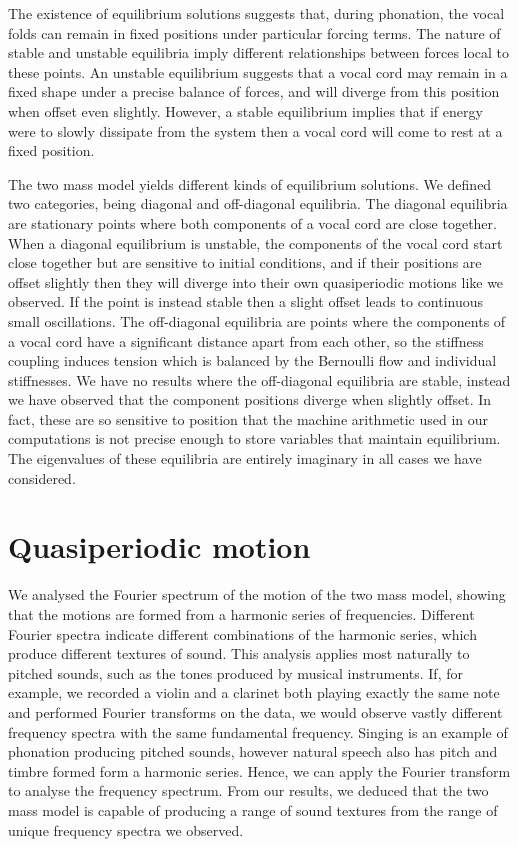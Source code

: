 \documentclass{report}
\begin{document}
The existence of equilibrium solutions suggests that, during phonation, the vocal folds can remain in fixed positions under particular forcing terms.
The nature of stable and unstable equilibria imply different relationships between forces local to these points.
An unstable equilibrium suggests that a vocal cord may remain in a fixed shape under a precise balance of forces,
and will diverge from this position when offset even slightly.
However, a stable equilibrium implies that if energy were to slowly dissipate from the system then a vocal cord will come to rest at a fixed position.

The two mass model yields different kinds of equilibrium solutions.
We defined two categories, being diagonal and off-diagonal equilibria.
The diagonal equilibria are stationary points where both components of a vocal cord are close together.
When a diagonal equilibrium is unstable,
the components of the vocal cord start close together but are sensitive to initial conditions,
and if their positions are offset slightly then they will diverge into their own quasiperiodic motions like we observed.
If the point is instead stable then a slight offset leads to continuous small oscillations.
The off-diagonal equilibria are points where the components of a vocal cord have a significant distance apart from each other, so the stiffness coupling induces tension which is balanced by the Bernoulli flow and individual stiffnesses.
We have no results where the off-diagonal equilibria are stable,
instead we have observed that the component positions diverge when slightly offset.
In fact, these are so sensitive to position that the machine arithmetic used in our computations is not precise enough to store variables that maintain equilibrium.
The eigenvalues of these equilibria are entirely imaginary in all cases we have considered.

\section{Quasiperiodic motion}

We analysed the Fourier spectrum of the motion of the two mass model,
showing that the motions are formed from a harmonic series of frequencies.
Different Fourier spectra indicate different combinations of the harmonic series,
which produce different textures of sound.
This analysis applies most naturally to pitched sounds, such as the tones produced by musical instruments.
If, for example, we recorded a violin and a clarinet both playing exactly the same note and performed Fourier transforms on the data,
we would observe vastly different frequency spectra with the same fundamental frequency.
Singing is an example of phonation producing pitched sounds,
however natural speech also has pitch and timbre formed form a harmonic series.
Hence, we can apply the Fourier transform to analyse the frequency spectrum.
From our results, we deduced that the two mass model is capable of producing a range of sound textures from the range of unique frequency spectra we observed.
\end{document}
